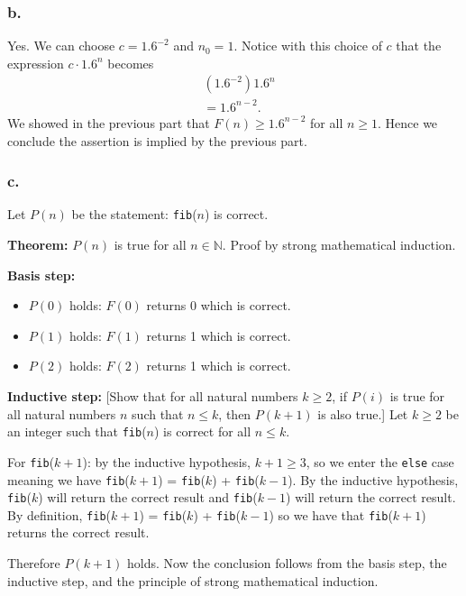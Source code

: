 \documentclass[11pt, letterpaper, titlepage]{article}
\begin{document}
\subsubsection*{b.}
Yes. We can choose $c = 1.6^{-2}$ and $n_0 = 1$. Notice with this choice of $c$ that the expression $c\cdot1.6^n$ becomes
\begin{align}
    &(1.6^{-2})1.6^n \\
    &= 1.6^{n-2}.
\end{align}
We showed in the previous part that $F(n) \geq 1.6^{n-2}$ for all $n \geq 1$. Hence we conclude the assertion is implied by the previous part.

\subsubsection*{c.}
Let $P(n)$ be the statement: \lstinline{fib}($n$) is correct.

\textbf{Theorem:} $P(n)$ is true for all $n \in \mathbb{N}$. Proof by strong mathematical induction.

\textbf{Basis step:} 
\begin{itemize}
    \item $P(0)$ holds: $F(0)$ returns 0 which is correct.
    \item $P(1)$ holds: $F(1)$ returns 1 which is correct.
    \item $P(2)$ holds: $F(2)$ returns 1 which is correct.
\end{itemize}

\textbf{Inductive step:} [Show that for all natural numbers $k \geq 2$, if $P(i)$ is true for all natural numbers $n$ such that $n \leq k$, then $P(k+1)$ is also true.] Let $k \geq 2$ be an integer such that \lstinline{fib}($n$) is correct for all $n \leq k$.

For \lstinline{fib}($k+1$): by the inductive hypothesis, $k + 1 \geq 3$, so we enter the \lstinline{else} case meaning we have \lstinline{fib}($k+1$) = \lstinline{fib}($k$) + \lstinline{fib}($k - 1$). By the inductive hypothesis, \lstinline{fib}($k$) will return the correct result and \lstinline{fib}($k - 1$) will return the correct result. By definition, \lstinline{fib}($k + 1$) = \lstinline{fib}($k$) + \lstinline{fib}($k - 1$) so we have that \lstinline{fib}($k + 1$) returns the correct result. 

Therefore $P(k+1)$ holds. Now the conclusion follows from the basis step, the inductive step, and the principle of strong mathematical induction.
\end{document}
